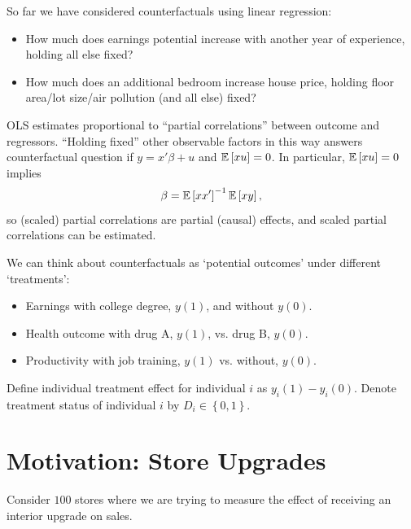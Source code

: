 
\begin{remark}	So far we have considered counterfactuals using linear regression:
	\begin{itemize}
		\item How much does earnings potential increase with another year of experience, holding all else fixed?
		\item How much does an additional bedroom increase house price, holding floor area/lot size/air pollution (and all else) fixed?
	\end{itemize}
	OLS estimates proportional to ``partial correlations'' between outcome and regressors. ``Holding fixed'' other observable factors in this way answers counterfactual question if $y = x'\beta + u$ and $\mathbb{E}\left[xu\right] = 0$. In particular, $\mathbb{E}\left[xu\right] = 0$ implies
	\[
		\beta = \mathbb{E}\left[xx'\right]^{-1}\mathbb{E}\left[xy\right]
	,\]
	so (scaled) partial correlations are partial (causal) effects, and scaled partial correlations can be estimated.
\end{remark}

\begin{definition}
	We can think about counterfactuals as `potential outcomes' under different `treatments':
	\begin{itemize}
		\item Earnings with college degree, $y(1)$, and without $y(0)$.
		\item Health outcome with drug A, $y(1)$, vs. drug B, $y(0)$.
		\item Productivity with job training, $y(1)$ vs. without, $y(0)$.
	\end{itemize}
	Define individual treatment effect for individual $i$ as $y_i(1) - y_i(0)$. Denote treatment status of individual $i$ by $D_i \in \left\{0, 1\right\}$.
\end{definition}

\section{Motivation: Store Upgrades}

Consider $100$ stores where we are trying to measure the effect of receiving an interior upgrade on sales.

